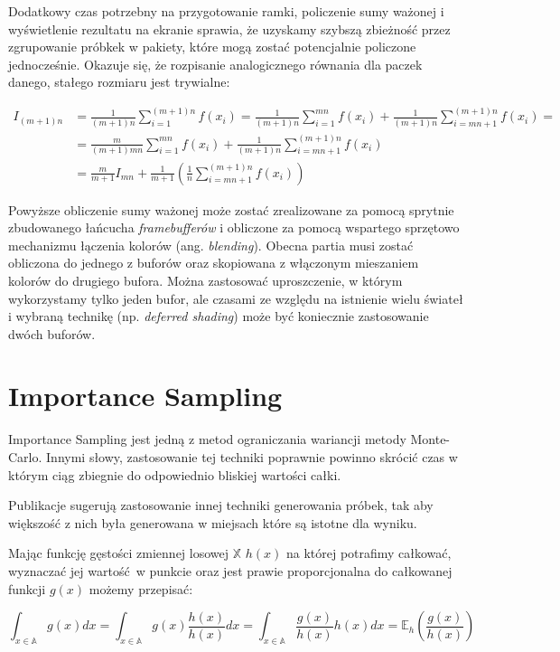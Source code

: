 \documentclass[../main.tex]{subfiles}
\begin{document}
Dodatkowy czas potrzebny na przygotowanie ramki, policzenie sumy ważonej i
wyświetlenie rezultatu na ekranie sprawia, że uzyskamy szybszą zbieżność przez
zgrupowanie próbkek w pakiety, które mogą zostać potencjalnie policzone
jednocześnie. Okazuje się, że rozpisanie analogicznego równania dla paczek
danego, stałego rozmiaru jest trywialne:

\begin{align*}
  I_{(m+1)n} &= \frac{1}{(m+1)n} \sum_{i=1}^{(m+1)n} f(x_i)
  = \frac{1}{(m+1)n} \sum_{i=1}^{mn} f(x_i)
    + \frac{1}{(m+1)n} \sum_{i=mn+1}^{(m+1)n} f(x_i) = \\
  &= \frac{m}{(m+1)mn} \sum_{i=1}^{mn} f(x_i)
    + \frac{1}{(m+1)n} \sum_{i=mn+1}^{(m+1)n} f(x_i) \\
  &= \frac{m}{m+1}I_{mn}
    + \frac{1}{m+1} \left(
        \frac{1}{n} \sum_{i=mn+1}^{(m+1)n} f(x_i)
    \right)
\end{align*}

Powyższe obliczenie sumy ważonej może zostać zrealizowane za pomocą sprytnie
zbudowanego łańcucha \textit{framebufferów} i obliczone za pomocą wspartego
sprzętowo mechanizmu łączenia kolorów (ang. \textit{blending}). Obecna partia
musi zostać obliczona do jednego z buforów oraz skopiowana z włączonym
mieszaniem kolorów do drugiego bufora. Można zastosować uproszczenie, w którym
wykorzystamy tylko jeden bufor, ale czasami ze względu na istnienie wielu
świateł i wybraną technikę (np. \textit{deferred shading}) może być koniecznie
zastosowanie dwóch buforów.

\section{Importance Sampling}

Importance Sampling jest jedną z metod ograniczania wariancji metody
Monte-Carlo. Innymi słowy, zastosowanie tej techniki poprawnie powinno
skrócić czas w którym ciąg zbiegnie do odpowiednio bliskiej wartości całki.

Publikacje \cite{Veach}\cite{MonteCarloAnderson} sugerują zastosowanie innej
techniki generowania próbek, tak aby większość z nich była generowana w
miejsach które są istotne dla wyniku.

Mając funkcję gęstości zmiennej losowej $\mathbb{X}$ $h(x)$ na której potrafimy
całkować, wyznaczać jej wartość w punkcie oraz jest prawie proporcjonalna do
całkowanej funkcji $g(x)$ możemy przepisać:

\[
  \int_{x \in \mathbb{A}} { g(x) dx } =
  \int_{x \in \mathbb{A}} { g(x) \frac{h(x)}{h(x)} dx } =
  \int_{x \in \mathbb{A}} { \frac{g(x)}{h(x)} h(x) dx } =
  \mathbb{E}_{h}\left({ \frac{g(x)}{h(x)} }\right)
\]
\end{document}
